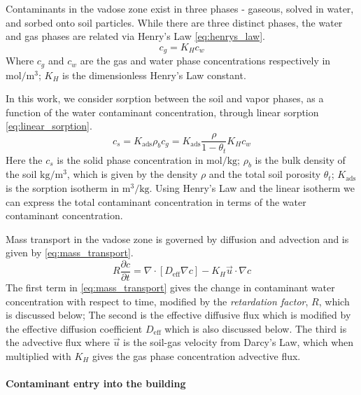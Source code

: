 Contaminants in the vadose zone exist in three phases - gaseous, solved in water, and sorbed onto soil particles.
While there are three distinct phases, the water and gas phases are related via Henry's Law \eqref{eq:henrys_law}.
\begin{equation}\label{eq:henrys_law}
  c_g = K_H c_w
\end{equation}
Where $c_g$ and $c_w$ are the gas and water phase concentrations respectively in $\mathrm{mol/m^3}$;
$K_H$ is the dimensionless Henry's Law constant.\par

In this work, we consider sorption between the soil and vapor phases, as a function of the water contaminant concentration, through linear sorption \eqref{eq:linear_sorption}.
\begin{equation}\label{eq:linear_sorption}
  c_s = K_\mathrm{ads} \rho_b c_g = K_\mathrm{ads} \frac{\rho}{1-\theta_t} K_H c_w
\end{equation}
Here the $c_s$ is the solid phase concentration in $\mathrm{mol/kg}$;
$\rho_b$ is the bulk density of the soil $\mathrm{kg/m^3}$, which is given by the density $\rho$ and the total soil porosity $\theta_t$;
$K_\mathrm{ads}$ is the sorption isotherm in $\mathrm{m^3/kg}$.
Using Henry's Law and the linear isotherm we can express the total contaminant concentration in terms of the water contaminant concentration.\par

Mass transport in the vadose zone is governed by diffusion and advection and is given by \eqref{eq:mass_transport}.
\begin{equation}\label{eq:mass_transport}
  R \frac{\partial c}{\partial t} =
    \nabla \cdot[ D_\mathrm{eff} \nabla c] -
    K_H \vec{u} \cdot \nabla c
\end{equation}
The first term in \eqref{eq:mass_transport} gives the change in contaminant water concentration with respect to time, modified by the \textit{retardation factor}, $R$, which is discussed below;
The second is the effective diffusive flux which is modified by the effective diffusion coefficient $D_\mathrm{eff}$ which is also discussed below.
The third is the advective flux where $\vec{u}$ is the soil-gas velocity from Darcy's Law, which when multiplied with $K_H$ gives the gas phase concentration advective flux.\par

\paragraph{Contaminant entry into the building}

